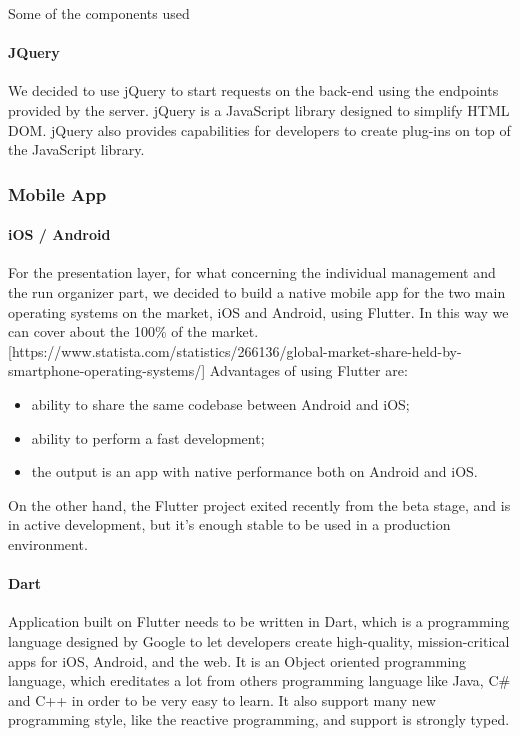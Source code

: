Some of the components used
\paragraph{JQuery}
We decided to use jQuery to start requests on the back-end using the endpoints provided by the server.
jQuery is a JavaScript library designed to simplify HTML DOM.
jQuery also provides capabilities for developers to create plug-ins on top of the JavaScript library.


\subsubsection{Mobile App}
\paragraph{iOS / Android}
For the presentation layer, for what concerning the individual management and the run organizer part, we decided to build a native mobile app for the two main operating systems on the market, iOS and Android, using Flutter.
In this way we can cover about the 100\% of the market. [https://www.statista.com/statistics/266136/global-market-share-held-by-smartphone-operating-systems/]
Advantages of using Flutter are:
\begin{itemize}
    \item ability to share the same codebase between Android and iOS;
    \item ability to perform a fast development;
    \item the output is an app with native performance both on Android and iOS.
\end{itemize}

On the other hand, the Flutter project exited recently from the beta stage, and is in active development, but it's enough stable to be used in a production environment.

\paragraph{Dart} Application built on Flutter needs to be written in Dart, which is a programming language designed by Google to let developers create high-quality, mission-critical apps for iOS, Android, and the web. It is an Object oriented programming language, which ereditates a lot from others programming language like Java, C\# and C++ in order to be very easy to learn.
It also support many new programming style, like the reactive programming, and support is strongly typed.

